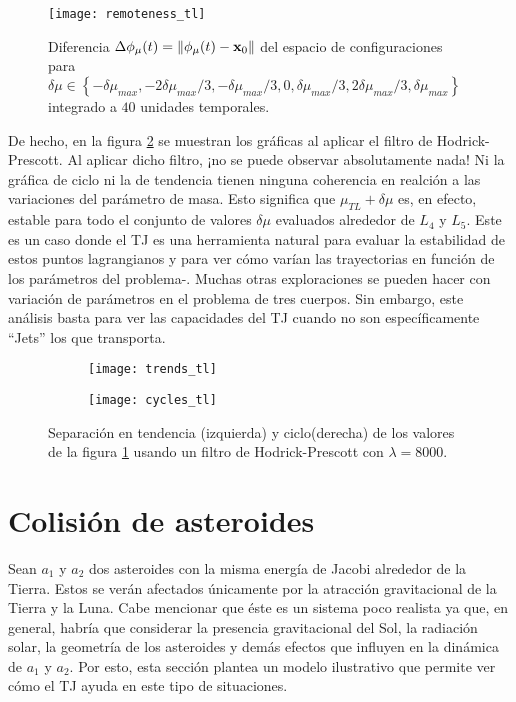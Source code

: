 \begin{figure}
 \centering
 \texttt{[image: remoteness\_tl]}
 \caption{Diferencia $\Delta\phi_\mu(t) = \left\lVert \phi_\mu(t) - \mathbf{x}_0 \right\rVert$ del espacio de configuraciones para $\delta\mu \in \left\lbrace -\delta\mu_{max}, -2\delta\mu_{max}/3, -\delta\mu_{max}/3, 0, \delta\mu_{max}/3, 2\delta\mu_{max}/3, \delta\mu_{max}  \right\rbrace$ integrado a $40$ unidades temporales.}
 \label{fig:remoteness_tl}
\end{figure}

De hecho, en la figura \ref{fig:trendcycle_tl} se muestran los gráficas al aplicar el filtro de Hodrick-Prescott. Al aplicar dicho filtro, ¡no se puede observar absolutamente nada! Ni la gráfica de ciclo ni la de tendencia tienen ninguna coherencia en realción a las variaciones del parámetro de masa. Esto significa que $\mu_{TL} + \delta\mu$ es, en efecto, estable para todo el conjunto de valores $\delta\mu$ evaluados alrededor de $L_4$ y $L_5$. Este es un caso donde el TJ es una herramienta natural para evaluar la estabilidad de estos puntos lagrangianos y para ver cómo varían las trayectorias en función de los parámetros del problema-. Muchas otras exploraciones se pueden hacer con variación de parámetros en el problema de tres cuerpos. Sin embargo, este análisis basta para ver las capacidades del TJ cuando no son específicamente ``Jets'' los que transporta.

\begin{figure}[h!]
\centering
\begin{subfigure}{0.49\textwidth}
	\centering
	\texttt{[image: trends\_tl]}
\end{subfigure}
%
\begin{subfigure}{0.49\textwidth}
	\centering
	\texttt{[image: cycles\_tl]}
\end{subfigure}
\caption{ Separación en tendencia (izquierda) y ciclo(derecha) de los valores de la figura \ref{fig:remoteness_tl} usando un filtro de Hodrick-Prescott con $\lambda = 8000$.}
\label{fig:trendcycle_tl}
\end{figure}

\pagebreak
\section{Colisión de asteroides}
\label{sec:asteroids}

Sean $a_1$ y $a_2$ dos asteroides con la misma energía de Jacobi alrededor de la Tierra. Estos se verán afectados únicamente por la atracción gravitacional de la Tierra y la Luna. Cabe mencionar que éste es un sistema poco realista ya que, en general, habría que considerar la presencia gravitacional del Sol, la radiación solar, la geometría de los asteroides y demás efectos que influyen en la dinámica de $a_1$ y $a_2$. Por esto, esta sección plantea un modelo ilustrativo que permite ver cómo el TJ  ayuda en este tipo de situaciones. 

